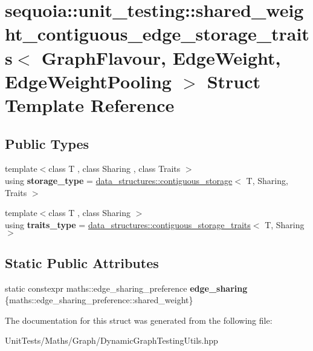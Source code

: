 \hypertarget{structsequoia_1_1unit__testing_1_1shared__weight__contiguous__edge__storage__traits}{}\section{sequoia\+::unit\+\_\+testing\+::shared\+\_\+weight\+\_\+contiguous\+\_\+edge\+\_\+storage\+\_\+traits$<$ Graph\+Flavour, Edge\+Weight, Edge\+Weight\+Pooling $>$ Struct Template Reference}
\label{structsequoia_1_1unit__testing_1_1shared__weight__contiguous__edge__storage__traits}
\subsection*{Public Types}
\begin{DoxyCompactItemize}
\item 
\mbox{\label{structsequoia_1_1unit__testing_1_1shared__weight__contiguous__edge__storage__traits_af7ae22df3b593b46eb2f49ba320ea4ae}} 
{\footnotesize template$<$class T , class Sharing , class Traits $>$ }\\using {\bfseries storage\+\_\+type} = \mbox{\hyperlink{classsequoia_1_1data__structures_1_1contiguous__storage}{data\+\_\+structures\+::contiguous\+\_\+storage}}$<$ T, Sharing, Traits $>$
\item 
\mbox{\label{structsequoia_1_1unit__testing_1_1shared__weight__contiguous__edge__storage__traits_a0b0442ef113d1c8263d21de098728ce0}} 
{\footnotesize template$<$class T , class Sharing $>$ }\\using {\bfseries traits\+\_\+type} = \mbox{\hyperlink{structsequoia_1_1data__structures_1_1contiguous__storage__traits}{data\+\_\+structures\+::contiguous\+\_\+storage\+\_\+traits}}$<$ T, Sharing $>$
\end{DoxyCompactItemize}
\subsection*{Static Public Attributes}
\begin{DoxyCompactItemize}
\item 
\mbox{\label{structsequoia_1_1unit__testing_1_1shared__weight__contiguous__edge__storage__traits_a19c1af73c28908960a56ae2608418ca5}} 
static constexpr maths\+::edge\+\_\+sharing\+\_\+preference {\bfseries edge\+\_\+sharing} \{maths\+::edge\+\_\+sharing\+\_\+preference\+::shared\+\_\+weight\}
\end{DoxyCompactItemize}


The documentation for this struct was generated from the following file\+:\begin{DoxyCompactItemize}
\item 
Unit\+Tests/\+Maths/\+Graph/Dynamic\+Graph\+Testing\+Utils.\+hpp\end{DoxyCompactItemize}
